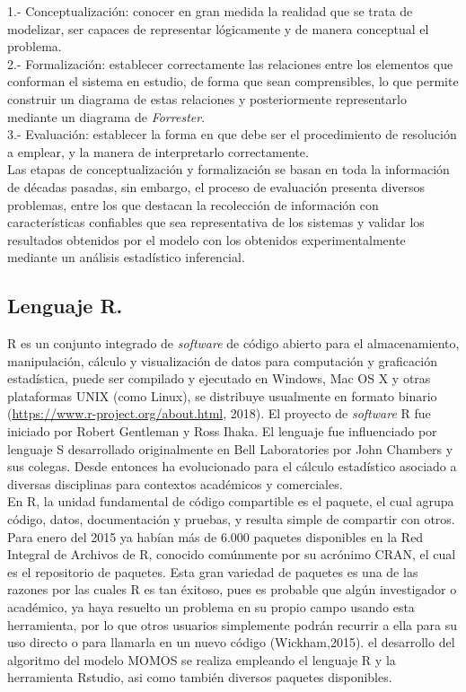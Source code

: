 1.- Conceptualizaci\'on: conocer en gran medida la realidad que se trata de modelizar, ser capaces de representar l\'ogicamente y de manera conceptual el problema. \\

2.- Formalizaci\'on: establecer correctamente las relaciones entre los elementos que conforman el sistema en estudio, de forma que sean comprensibles, lo que permite construir un diagrama de estas relaciones y posteriormente representarlo mediante un diagrama de \textit{Forrester}.\\

3.- Evaluaci\'on: establecer la forma en que debe ser el procedimiento de resoluci\'on a emplear, y la manera de interpretarlo correctamente.\\


Las etapas de conceptualizaci\'on y formalizaci\'on se basan en toda la informaci\'on de d\'ecadas pasadas, sin embargo, el proceso de evaluaci\'on presenta diversos problemas, entre los que destacan la recolecci\'on de informaci\'on con caracter\'isticas confiables que sea representativa de los sistemas y validar los resultados obtenidos por el modelo con los obtenidos experimentalmente mediante un an\'alisis estad\'istico inferencial.


\subsection{Lenguaje R.}

R es un conjunto  integrado de \textit{software} de c\'odigo abierto para el almacenamiento, manipulaci\'on, c\'alculo y visualizaci\'on de datos para computaci\'on y graficaci\'on estad\'istica, puede ser compilado y ejecutado en Windows, Mac OS X y otras  plataformas UNIX (como Linux), se distribuye usualmente en formato binario (\url{https://www.r-project.org/about.html}, 2018). El proyecto de \emph{software} R fue iniciado por Robert Gentleman y Ross Ihaka. El lenguaje fue influenciado por  lenguaje S desarrollado originalmente en Bell Laboratories por John Chambers y sus colegas. Desde entonces ha evolucionado  para el c\'alculo estad\'istico asociado a diversas disciplinas para contextos acad\'emicos y comerciales. \\

En R, la unidad fundamental de c\'odigo compartible es el paquete, el cual agrupa c\'odigo, datos, documentaci\'on y pruebas, y resulta simple de compartir con otros. Para enero del 2015 ya hab\'ian m\'as de 6.000 paquetes disponibles en la Red Integral de Archivos de R, conocido com\'unmente por su acr\'onimo CRAN, el cual es el repositorio de paquetes. Esta gran variedad de paquetes es una de las razones por las cuales R es tan \'exitoso, pues es probable que alg\'un investigador o acad\'emico, ya haya resuelto un problema en su propio campo usando esta herramienta, por lo que otros usuarios simplemente podr\'an recurrir a ella para su uso directo o para llamarla en un nuevo c\'odigo (Wickham,2015). el desarrollo del algoritmo del modelo MOMOS se realiza empleando el lenguaje R y la herramienta Rstudio, asi como tambi\'en diversos paquetes disponibles. \\


